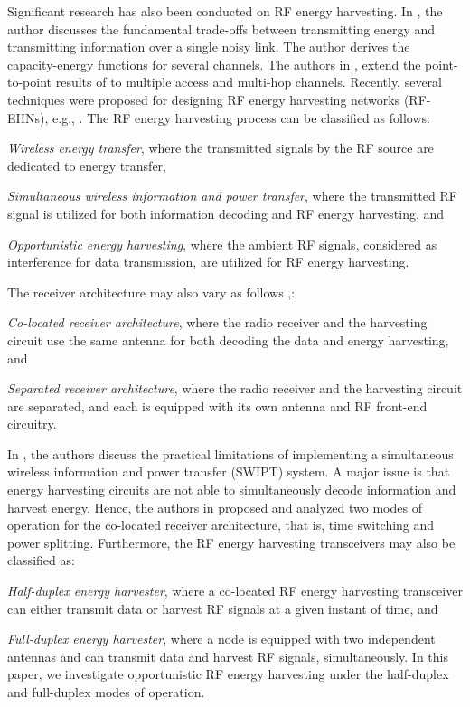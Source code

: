 \documentclass[draftcls,12pt,onecolumn]{IEEEtran}
\begin{document}
\indent Significant research has also been conducted on RF energy harvesting. In \cite{varshney2008transporting}, the author discusses the fundamental trade-offs between transmitting energy and transmitting information over a single noisy link. The author derives the capacity-energy functions for several channels. The authors in \cite{fouladgar2012transfer}, extend the point-to-point results of \cite{varshney2008transporting} to multiple access and multi-hop channels. Recently, several techniques were proposed for designing RF energy harvesting networks (RF-EHNs), e.g., \cite{lu2014survey}. The RF energy harvesting process can be classified as follows: \begin{inparaenum}
\item \emph{Wireless energy transfer}, where the transmitted signals by the RF source are dedicated to energy transfer,
\item \emph{Simultaneous wireless information and power transfer}, where the transmitted RF signal is utilized for both information decoding and RF energy harvesting, and
\item \emph{Opportunistic energy harvesting}, where the ambient RF signals,  considered as interference for data transmission, are utilized for RF energy harvesting.  
\end{inparaenum}
The receiver architecture may also vary as follows \cite{lu2014survey},\cite{zhang2011mimo}: \begin{inparaenum}
\item \emph{Co-located receiver architecture}, where the radio receiver and the harvesting circuit use the same antenna for both decoding the data and energy harvesting, and
\item \emph{Separated receiver architecture}, where the radio receiver and the harvesting circuit are separated, and each is equipped with its own antenna and RF front-end circuitry.
\end{inparaenum}
\newline \indent In \cite{zhang2011mimo}, the authors discuss the practical limitations of implementing a simultaneous wireless information and power transfer (SWIPT) system. A major issue is that energy harvesting circuits are not able to simultaneously decode information and harvest energy. Hence, the authors in \cite{zhang2011mimo} proposed and analyzed two modes of operation for the co-located receiver architecture, that is, time switching and power splitting. Furthermore, the RF energy harvesting transceivers may also be classified as: \begin{inparaenum}
\item \emph{Half-duplex energy harvester}, where a co-located RF energy harvesting transceiver can either transmit data or harvest RF signals at a given instant of time, and
\item \emph{Full-duplex energy harvester}, where a node is equipped with two independent antennas and can transmit data and harvest RF signals, simultaneously. In this paper, we investigate opportunistic RF energy harvesting under the half-duplex and full-duplex modes of operation.
\end{inparaenum}
\end{document}
